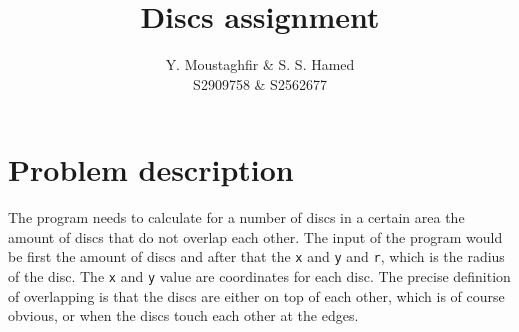 \documentclass[a4paper,10pt]{article}
\title{Discs assignment}
\author{Y. Moustaghfir \& S. S. Hamed\\
        S2909758 \& S2562677}
\begin{document}
\maketitle

\section{Problem description}
The program needs to calculate for a number of discs in a certain area the amount of discs that do not overlap each other. The input of the program would be first the amount of discs and after that the {\tt x} and {\tt y} and {\tt r}, which is the radius of the disc. The {\tt x} and {\tt y} value are coordinates for each disc. The precise definition of overlapping is that the discs are either on top of each other, which is of course obvious, or when the discs touch each other at the edges. 
\end{document}
